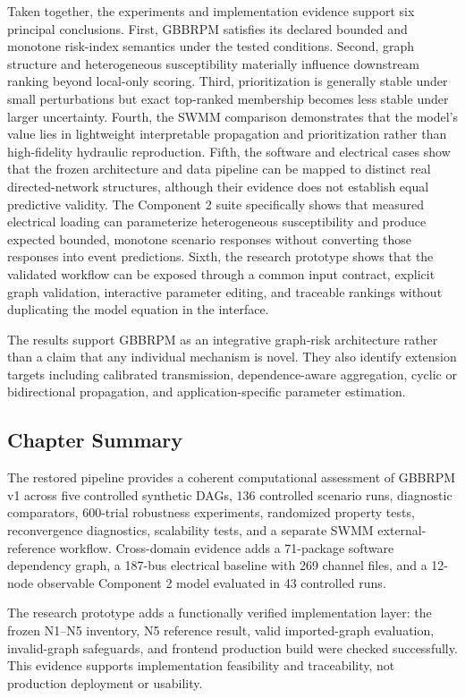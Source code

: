 Taken together, the experiments and implementation evidence support six principal conclusions.
First, GBBRPM satisfies its declared bounded and monotone risk-index
semantics under the tested conditions. Second, graph structure and
heterogeneous susceptibility materially influence downstream ranking
beyond local-only scoring. Third, prioritization is generally stable
under small perturbations but exact top-ranked membership becomes less
stable under larger uncertainty. Fourth, the SWMM comparison demonstrates
that the model's value lies in lightweight interpretable propagation and
prioritization rather than high-fidelity hydraulic reproduction. Fifth,
the software and electrical cases show that the frozen architecture and
data pipeline can be mapped to distinct real directed-network structures,
although their evidence does not establish equal predictive validity. The
Component 2 suite specifically shows that measured electrical loading can
parameterize heterogeneous susceptibility and produce expected bounded,
monotone scenario responses without converting those responses into event
predictions. Sixth, the research prototype shows that the validated
workflow can be exposed through a common input contract, explicit graph
validation, interactive parameter editing, and traceable rankings without
duplicating the model equation in the interface.

The results support GBBRPM as an integrative graph-risk architecture
rather than a claim that any individual mechanism is novel. They also
identify extension targets including calibrated transmission,
dependence-aware aggregation, cyclic or bidirectional propagation, and
application-specific parameter estimation.

\subsection{Chapter Summary}

The restored pipeline provides a coherent computational assessment of
GBBRPM v1 across five controlled synthetic DAGs, 136 controlled scenario
runs, diagnostic comparators, 600-trial robustness experiments,
randomized property tests, reconvergence diagnostics, scalability tests,
and a separate SWMM external-reference workflow. Cross-domain evidence
adds a 71-package software dependency graph, a 187-bus electrical
baseline with 269 channel files, and a 12-node observable Component 2
model evaluated in 43 controlled runs.

The research prototype adds a functionally verified implementation layer:
the frozen N1--N5 inventory, N5 reference result, valid imported-graph
evaluation, invalid-graph safeguards, and frontend production build were
checked successfully. This evidence supports implementation feasibility
and traceability, not production deployment or usability.

